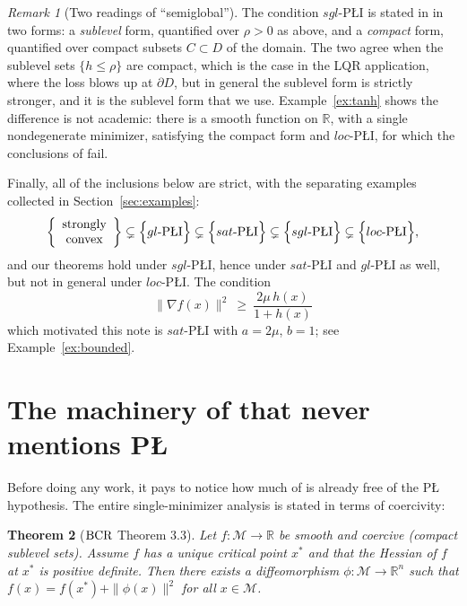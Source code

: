 \documentclass[11pt]{article}
\theoremstyle{plain}
\newtheorem{thm}{Theorem}[section]
\theoremstyle{definition}
\theoremstyle{remark}
\newtheorem{rem}[thm]{Remark}
\newcommand{\M}{\mathcal{M}}
\newcommand{\R}{\mathbb{R}}
\newcommand{\bcr}{\textup{BCR}}
\begin{document}
\begin{rem}[Two readings of ``semiglobal'']\label{rem:twosgl}
The condition $sgl$-P\L{}I is stated in \cite[\S2]{Sontag2025L4DC} in two forms:
a \emph{sublevel} form, quantified over $\rho>0$ as above, and a \emph{compact}
form, quantified over compact subsets $C\subset D$ of the domain. The two agree
when the sublevel sets $\{h\le\rho\}$ are compact, which is the case in the LQR
application, where the loss blows up at $\partial D$, but in general the
sublevel form is strictly stronger, and it is the sublevel form that we use.
Example~\ref{ex:tanh} shows the difference is not academic: there is a smooth
function on $\R$, with a single nondegenerate minimizer, satisfying the compact
form and $loc$-P\L{}I, for which the conclusions of \cite{BCR2026} fail.
\end{rem}

Finally, all of the inclusions below are strict, with the separating examples
collected in Section~\ref{sec:examples}:
\[
  \left\{\begin{array}{c}\text{strongly}\\\text{convex}\end{array}\right\}
  \subsetneq
  \Bigl\{gl\text{-P\L{}I}\Bigr\}
  \subsetneq
  \Bigl\{sat\text{-P\L{}I}\Bigr\}
  \subsetneq
  \Bigl\{sgl\text{-P\L{}I}\Bigr\}
  \subsetneq
  \Bigl\{loc\text{-P\L{}I}\Bigr\} ,
\]
and our theorems hold under $sgl$-P\L{}I, hence under $sat$-P\L{}I and
$gl$-P\L{}I as well, but not in general under $loc$-P\L{}I.
The condition
\[
  \|\nabla f(x)\|^2 \ \ge\ \frac{2\mu\, h(x)}{1+h(x)}
\]
which motivated this note is $sat$-P\L{}I with $a=2\mu$, $b=1$; see
Example~\ref{ex:bounded}.

\section{The machinery of \cite{BCR2026} that never mentions P\L{}}
\label{sec:free}

Before doing any work, it pays to notice how much of \cite{BCR2026} is already
free of the P\L{} hypothesis. The entire single-minimizer analysis is stated in
terms of coercivity:

\begin{thm}[$\bcr$ Theorem 3.3]\label{thm:BCR33}
Let $f\colon\M\to\R$ be smooth and coercive (compact sublevel sets). Assume $f$
has a unique critical point $x^*$ and that the Hessian of $f$ at $x^*$ is
positive definite. Then there exists a diffeomorphism $\phi\colon\M\to\R^n$
such that $f(x) = f(x^*) + \|\phi(x)\|^2$ for all $x\in\M$.
\end{thm}
\end{document}
